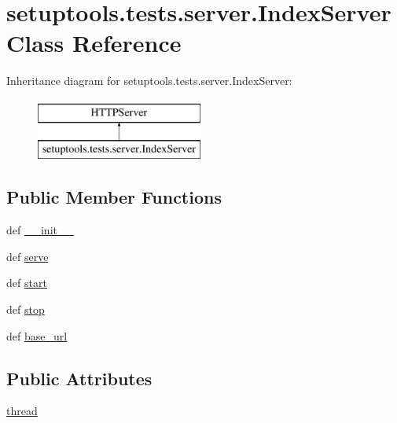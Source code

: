 \hypertarget{classsetuptools_1_1tests_1_1server_1_1IndexServer}{}\section{setuptools.\+tests.\+server.\+Index\+Server Class Reference}
\label{classsetuptools_1_1tests_1_1server_1_1IndexServer}
Inheritance diagram for setuptools.\+tests.\+server.\+Index\+Server\+:\begin{figure}[H]
\begin{center}
\leavevmode
\includegraphics[height=2.000000cm]{classsetuptools_1_1tests_1_1server_1_1IndexServer}
\end{center}
\end{figure}
\subsection*{Public Member Functions}
\begin{DoxyCompactItemize}
\item 
def \hyperlink{classsetuptools_1_1tests_1_1server_1_1IndexServer_a910f4bb26ab1816d9a5364cd143f8553}{\+\_\+\+\_\+init\+\_\+\+\_\+}
\item 
def \hyperlink{classsetuptools_1_1tests_1_1server_1_1IndexServer_a5ab3bbb5fded2933fc0fb21305bde25f}{serve}
\item 
def \hyperlink{classsetuptools_1_1tests_1_1server_1_1IndexServer_a99a59930eafb347b611b851079169a2b}{start}
\item 
def \hyperlink{classsetuptools_1_1tests_1_1server_1_1IndexServer_a0be55d7dbb154064f7d67ea0b05d3d13}{stop}
\item 
def \hyperlink{classsetuptools_1_1tests_1_1server_1_1IndexServer_a50e6b820a6fd63c300965cae28b45631}{base\+\_\+url}
\end{DoxyCompactItemize}
\subsection*{Public Attributes}
\begin{DoxyCompactItemize}
\item 
\hyperlink{classsetuptools_1_1tests_1_1server_1_1IndexServer_a8fd984714ac210062a2c15b115f1c950}{thread}
\end{DoxyCompactItemize}


